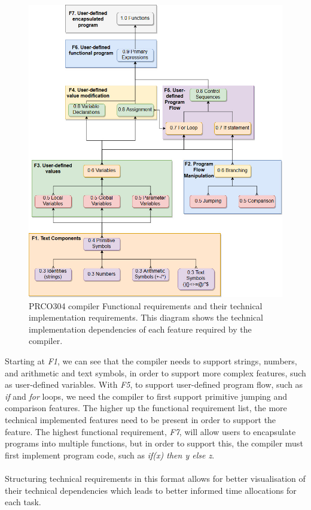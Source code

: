 \documentclass[11pt,a4paper]{report}
\newcommand{\scname}{PRCO304}
\begin{document}
\begin{figure}[H]
\begin{center}
\includegraphics[scale=0.5]{compiler_dependencies}
\end{center}
\caption{\scname{} compiler Functional requirements and their technical implementation requirements. This diagram shows the technical implementation dependencies of each feature required by the compiler.}
\label{fig:compiler_dependencies}
\end{figure}

\scriptsize
Starting at \textit{F1}, we can see that the compiler needs to support strings, numbers, and arithmetic and text symbols, in order to support more complex features, such as user-defined variables. With \textit{F5}, to support user-defined program flow, such as \textit{if} and \textit{for} loops, we need the compiler to first support primitive jumping and comparison features. The higher up the functional requirement list, the more technical implemented features need to be present in order to support the feature. The highest functional requirement, \textit{F7}, will allow users to encapsulate programs into multiple functions, but in order to support this, the compiler must first implement program code, such as \textit{if(x) then y else z}.\\\\Structuring technical requirements in this format allows for better visualisation of their technical dependencies which leads to better informed time allocations for each task.
\normalsize
\end{document}
